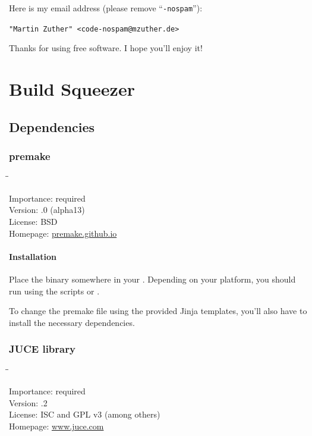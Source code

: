 Here is my email address (please remove ``\texttt{-nospam}''):

\begin{center}
  \texttt{"Martin Zuther" <code-nospam@mzuther.de>}
\end{center}

Thanks for using free software.  I hope you'll enjoy it!

\appendix

\chapter{Build Squeezer}
\label{chap:build_squeezer}

\section{Dependencies}
\label{sec:dependencies}

\subsection{premake}
\label{sec:dependencies_premake}

\begin{tabbing}
  \hspace*{6em}\=\=\kill

  Importance:  \> required \\
  Version:     .0 (alpha13) \\
  License:     \> BSD \\
  Homepage:    \> \href{https://premake.github.io/}{premake.github.io}
\end{tabbing}

\subsubsection{Installation}

Place the binary somewhere in your .  Depending on your
platform, you should run  using the scripts
 or .

To change the premake file using the provided Jinja templates, you'll
also have to install the necessary dependencies.

\subsection{JUCE library}

\begin{tabbing}
  \hspace*{6em}\=\=\kill

  Importance:  \> required \\
  Version:     .2 \\
  License:     \> ISC and GPL v3 (among others) \\
  Homepage:    \> \href{http://www.juce.com/}{www.juce.com}
\end{tabbing}

